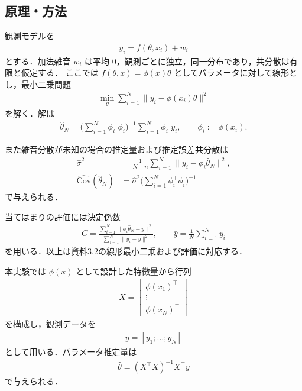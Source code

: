 \subsection{原理・方法}

観測モデルを
\begin{align}
 y_i = f(\theta, x_i) + w_i
\end{align}
とする．加法雑音 $w_i$ は平均 $0$，観測ごとに独立，同一分布であり，共分散は有限と仮定する．
ここでは $f(\theta, x) = \phi(x)\theta$ としてパラメータに対して線形とし，最小二乗問題
\begin{align}
 \min_{\theta}\sum_{i=1}^{N}\lVert y_i - \phi(x_i)\theta\rVert^2
\end{align}
を解く．解は
\begin{align}
 \hat{\theta}_N
  = \Big( \sum_{i=1}^{N} \phi_i^\top \phi_i \Big)^{-1}
    \sum_{i=1}^{N} \phi_i^\top y_i,
 \qquad \phi_i := \phi(x_i).
\end{align}

また雑音分散が未知の場合の推定量および推定誤差共分散は
\begin{align}
 \hat{\sigma}^2
 &= \frac{1}{N-n} \sum_{i=1}^{N} \lVert y_i - \phi_i \hat{\theta}_N \rVert^2, \\
 \widehat{\mathrm{Cov}}(\hat{\theta}_N)
 &= \hat{\sigma}^2 \Big( \sum_{i=1}^{N} \phi_i^\top \phi_i \Big)^{-1}
\end{align}
で与えられる．

当てはまりの評価には決定係数
\begin{align}
 C = \frac{\sum_{i=1}^{N}\lVert \phi_i \hat{\theta}_N - \bar{y} \rVert^2}
          {\sum_{i=1}^{N}\lVert y_i - \bar{y} \rVert^2},
 \qquad
 \bar{y} = \frac{1}{N}\sum_{i=1}^{N} y_i
\end{align}
を用いる．以上は資料3.2の線形最小二乗および評価に対応する．


本実験では $\phi(x)$ として設計した特徴量から行列
\begin{align}
 X = \begin{bmatrix}
  \phi(x_1)^\top \\
  \vdots \\
  \phi(x_N)^\top
 \end{bmatrix}
\end{align}
を構成し，観測データを
\begin{align}
 y = [y_1; \dots; y_N]
\end{align}
として用いる．パラメータ推定量は
\begin{align}
 \hat{\theta} = (X^\top X)^{-1} X^\top y
\end{align}
で与えられる．

